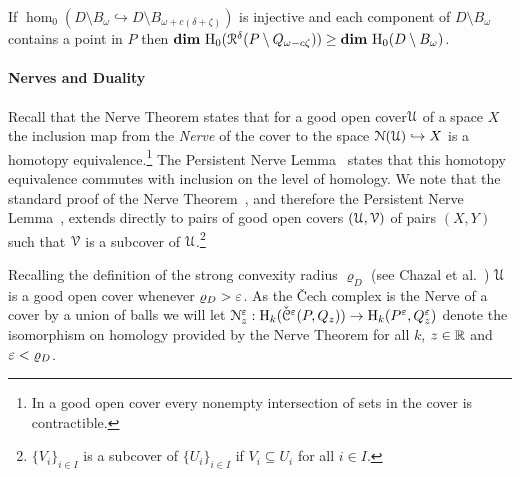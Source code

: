 
\begin{lemma}\label{lem:assumption2}
  If $\hom_0(D\setminus B_\omega\hookrightarrow D\setminus B_{\omega+c(\delta+\zeta)})$ is injective and each component of $D\setminus B_\omega$ contains a point in $P$ then $\mathbf{dim}~\mathrm{H}_0(\mathcal{R}^\delta(P\setminus Q_{\omega-c\zeta})) \geq \mathbf{dim}~\mathrm{H}_0(D\setminus B_\omega)$.
\end{lemma}

\paragraph*{Nerves and Duality}

Recall that the Nerve Theorem states that for a good open cover$\mathcal{U}$ of a space $X$ the inclusion map from the \emph{Nerve} of the cover to the space $\mathcal{N}(\mathcal{U})\hookrightarrow X$ is a homotopy equivalence.\footnote{In a good open cover every nonempty intersection of sets in the cover is contractible.}
The Persistent Nerve Lemma~\cite{chazal08towards} states that this homotopy equivalence commutes with inclusion on the level of homology.
We note that the standard proof of the Nerve Theorem~\cite{kozlov07combinatorial}, and therefore the Persistent Nerve Lemma~\cite{chazal08towards}, extends directly to pairs of good open covers $(\mathcal{U}, \mathcal{V})$ of pairs $(X, Y)$ such that $\mathcal{V}$ is a subcover of $\mathcal{U}$.\footnote{$\{V_i\}_{i\in I}$ is a subcover of $\{U_i\}_{i\in I}$ if $V_i\subseteq U_i$ for all $i\in I$.}

Recalling the definition of the strong convexity radius $\varrho_D$ (see Chazal et al.~\cite{chazal09analysis}) $\mathcal{U}$ is a good open cover whenever $\varrho_D > \varepsilon$.
As the \v Cech complex is the Nerve of a cover by a union of balls we will let $\mathcal{N}_z^\varepsilon : \mathrm{H}_k(\check{\mathcal{C}}^\varepsilon(P,Q_z))\to \mathrm{H}_k(P^\varepsilon, Q_z^\varepsilon)$ denote the isomorphism on homology provided by the Nerve Theorem for all $k$, $z\in\mathbb{R}$ and $\varepsilon < \varrho_D$.


